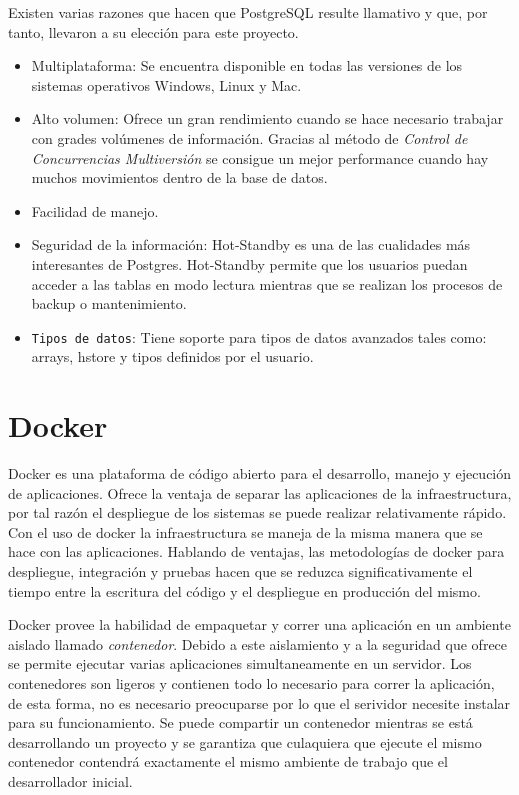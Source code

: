 Existen varias razones que hacen que PostgreSQL resulte llamativo y que, por tanto, llevaron a su elección para este proyecto.
\begin{itemize}
	\item Multiplataforma: Se encuentra disponible en todas las versiones de los sistemas operativos Windows, Linux y Mac.
	\item Alto volumen: Ofrece un gran rendimiento cuando se hace necesario trabajar con grades volúmenes de información. Gracias al método de \textit{Control de Concurrencias Multiversión} se consigue un mejor performance cuando hay muchos movimientos dentro de la base de datos.
	\item Facilidad de manejo.
	\item Seguridad de la información: Hot-Standby es una de las cualidades más interesantes de Postgres. Hot-Standby permite que los usuarios puedan acceder a las tablas en modo lectura mientras que se realizan los procesos de backup o mantenimiento.
	\item \texttt{Tipos de datos}: Tiene soporte para tipos de datos avanzados tales como: arrays, hstore y tipos definidos por el usuario.
\end{itemize}

\section{Docker} 

Docker es una plataforma de código abierto para el desarrollo, manejo y ejecución de aplicaciones. Ofrece la ventaja de separar las aplicaciones de la infraestructura, por tal razón el despliegue de los sistemas se puede realizar relativamente rápido. Con el uso de docker  la infraestructura se maneja de la misma manera que se hace con las aplicaciones. Hablando de ventajas, las metodologías de docker para despliegue, integración y pruebas hacen que se reduzca significativamente el tiempo entre la escritura del código y el despliegue en producción del mismo. \cite{docker_dfn}

Docker provee la habilidad de empaquetar y correr una aplicación en un ambiente aislado llamado \textit{contenedor}. Debido a este aislamiento y a la seguridad que ofrece se permite ejecutar varias aplicaciones simultaneamente en un servidor. Los contenedores son ligeros y contienen todo lo necesario para correr la aplicación, de esta forma, no es necesario preocuparse por lo que el serividor necesite instalar para su funcionamiento. Se puede compartir un contenedor mientras se está desarrollando  un proyecto y se garantiza que culaquiera que ejecute el mismo contenedor contendrá exactamente el mismo ambiente de trabajo que el desarrollador inicial.\cite{docker_dfn}

